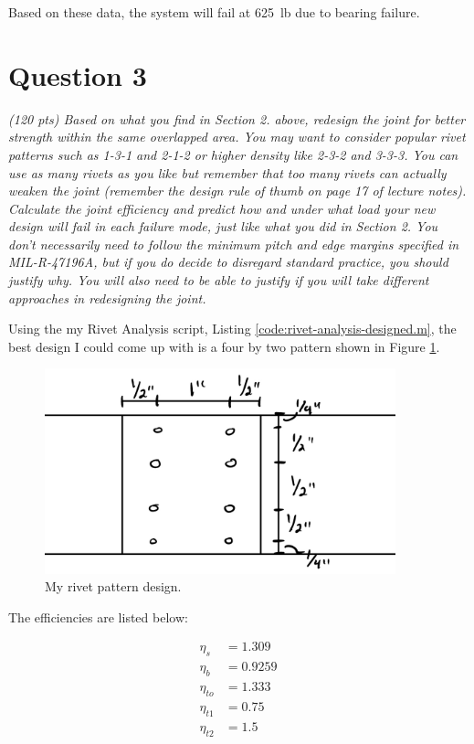 \documentclass[12 pt]{article}
\begin{document}
Based on these data, the system will fail at \qty{625}{lb} due to bearing failure.

\section*{Question 3} \label{question_3}
\textit{(120 pts) Based on what you find in Section 2. above, redesign the joint for better strength within the same overlapped area.  You may want to consider popular rivet patterns such as 1-3-1 and 2-1-2 or higher density like 2-3-2 and 3-3-3.  You can use as many rivets as you like but remember that too many rivets can actually weaken the joint (remember the design rule of thumb on page 17 of lecture notes).  Calculate the joint efficiency and predict how and under what load your new design will fail in each failure mode, just like what you did in Section 2.  You don't necessarily need to follow the minimum pitch and edge margins specified in MIL-R-47196A, but if you do decide to disregard standard practice, you should justify why.  You will also need to be able to justify if you will take different approaches in redesigning the joint.}

Using the my Rivet Analysis script, Listing \ref{code:rivet-analysis-designed.m}, the best design I could come up with is a four by two pattern shown in Figure \ref{fig:my-design}.

\begin{figure}[!htbp]
\centering
\includegraphics[width=4in]{images/my-design}
\caption{My rivet pattern design.}
\label{fig:my-design}
\end{figure}

The efficiencies are listed below:

\begin{align*}
\eta_s&=\num{1.309} \\
\eta_b&=\num{0.9259} \\
\eta_{to}&=\num{1.333} \\
\eta_{t1}&=\num{0.75} \\
\eta_{t2}&=\num{1.5}
\end{align*}
\end{document}
